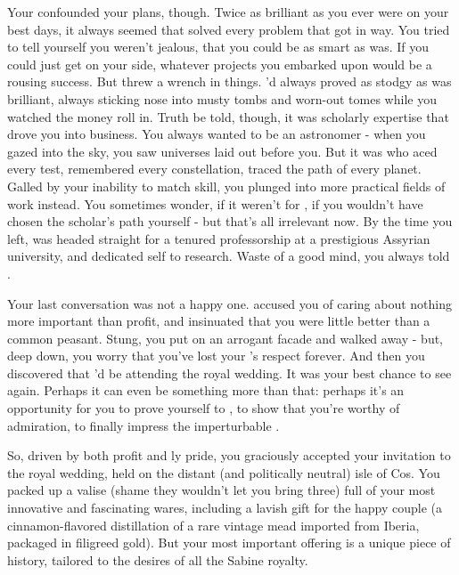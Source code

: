 \documentclass[char]{Kos}
\begin{document}
Your \cAnarchist{\sibling} \cAnarchist{} confounded your plans, though. Twice as brilliant as you ever were on your best days, it always seemed that \cAnarchist{\they} solved every problem that got in \cAnarchist{\their} way. You tried to tell yourself you weren't jealous, that you could be as smart as \cAnarchist{\they} was. If you could just get \cAnarchist{\them} on your side, whatever projects you embarked upon would be a rousing success. But \cAnarchist{\they} threw a wrench in things. \cAnarchist{\they}'d always proved as stodgy as \cAnarchist{\they} was brilliant, always sticking \cAnarchist{\their} nose into musty tombs and worn-out tomes while you watched the money roll in. Truth be told, though, it was \cAnarchist{\their} scholarly expertise that drove you into business. You always wanted to be an astronomer - when you gazed into the sky, you saw universes laid out before you. But it was \cAnarchist{} who aced every test, remembered every constellation, traced the path of every planet. Galled by your inability to match \cAnarchist{\their} skill, you plunged into more practical fields of work instead. You sometimes wonder, if it weren't for \cAnarchist{}, if you wouldn't have chosen the scholar's path yourself - but that's all irrelevant now. By the time you left, \cAnarchist{\they} was headed straight for a tenured professorship at a prestigious Assyrian university, and dedicated \cAnarchist{\them}self to research. Waste of a good mind, you always told \cAnarchist{\them}.

Your last conversation was not a happy one. \cAnarchist{\They} accused you of caring about nothing more important than profit, and insinuated that you were little better than a common peasant. Stung, you put on an arrogant facade and walked away - but, deep down, you worry that you've lost your \cAnarchist{\sibling}'s respect forever. And then you discovered that \cAnarchist{\they}'d be attending the royal wedding. It was your best chance to see \cAnarchist{\them} again. Perhaps it can even be something more than that: perhaps it's an opportunity for you to prove yourself to \cAnarchist{\them}, to show \cAnarchist{\them} that you're worthy of \cAnarchist{\their} admiration, to finally impress the imperturbable \cAnarchist{}.

So, driven by both profit and \cMerchant{\sibling}ly pride, you graciously accepted your invitation to the royal wedding, held on the distant (and politically neutral) isle of Cos. You packed up a valise (shame they wouldn't let you bring three) full of your most innovative and fascinating wares, including a lavish gift for the happy couple (a cinnamon-flavored distillation of a rare vintage mead imported from Iberia, packaged in filigreed gold). But your most important offering is a unique piece of history, tailored to the desires of all the Sabine royalty. 
\end{document}
